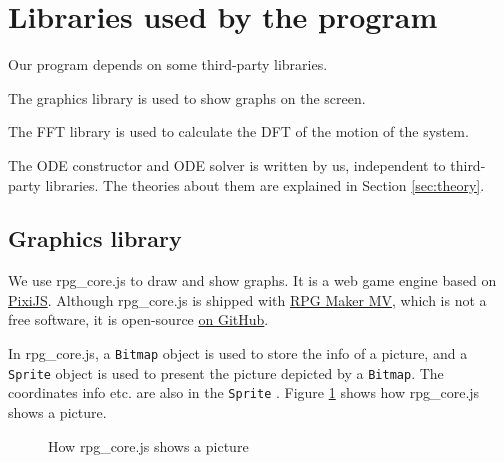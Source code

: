 \documentclass[12pt]{article}
\begin{document}
\section{Libraries used by the program}

Our program depends on some third-party libraries.

The graphics library is used to show graphs on the screen.

The FFT library is used to calculate the DFT of the motion of the system.

The ODE constructor and ODE solver is written by us,
independent to third-party libraries.
The theories about them are explained in Section \ref{sec:theory}.

\subsection{Graphics library}

We use rpg\_core.js to draw and show graphs.
It is a web game engine based on \href{https://www.pixijs.com}{PixiJS}.
Although rpg\_core.js is shipped with \href{https://tkool.jp/mv}{RPG Maker MV},
which is not a free software,
it is open-source \href{https://github.com/rpgtkoolmv/corescript}{on GitHub}.

In rpg\_core.js, a \verb!Bitmap! object is used to store the info of a picture,
and a \verb!Sprite! object is used to present the picture depicted by a \verb!Bitmap!.
The coordinates info etc. are also in the \verb!Sprite! \cite{rmmvhelp}.
Figure \ref{fig:show_picture} shows how rpg\_core.js shows a picture.

\begin{figure}[h]
  \centering
  \caption{How rpg\_core.js shows a picture}
  \label{fig:show_picture}
\end{figure}
\end{document}
